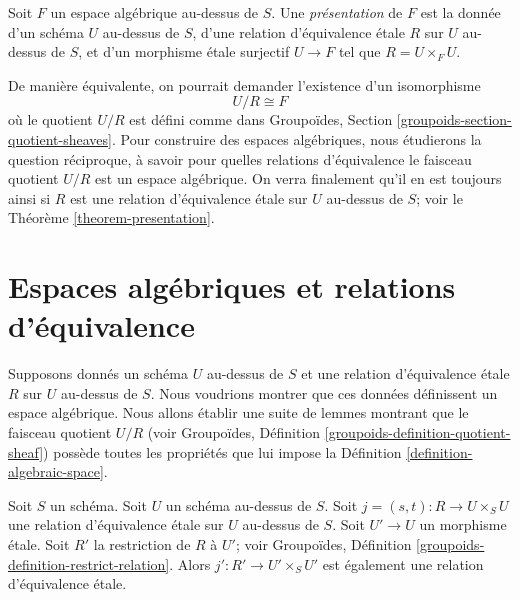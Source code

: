 \begin{definition}
\label{definition-presentation}
Soit $F$ un espace algébrique au-dessus de $S$.
Une {\it présentation} de $F$ est la donnée d'un schéma
$U$ au-dessus de $S$, d'une relation d'équivalence \'etale $R$ sur $U$ au-dessus de $S$, et
d'un morphisme \'etale surjectif $U \to F$ tel que $R = U \times_F U$.
\end{definition}

\noindent
De manière équivalente, on pourrait demander l'existence d'un isomorphisme
$$
U/R \cong F
$$
où le quotient $U/R$ est défini comme dans
Groupoïdes, Section \ref{groupoids-section-quotient-sheaves}.
Pour construire des espaces algébriques, nous étudierons la question réciproque, à savoir
pour quelles relations d'équivalence le faisceau quotient $U/R$ est un espace algébrique.
On verra finalement qu'il en est toujours ainsi si $R$ est une relation
d'équivalence \'etale sur $U$ au-dessus de $S$; voir le Théorème \ref{theorem-presentation}.





























\section{Espaces algébriques et relations d'équivalence}
\label{section-spaces-from-equivalence-relations}

\noindent
Supposons donnés un schéma $U$ au-dessus de $S$
et une relation d'équivalence \'etale $R$ sur $U$ au-dessus de $S$.
Nous voudrions montrer que ces données définissent un espace algébrique.
Nous allons établir une suite de lemmes montrant que le faisceau quotient $U/R$
(voir Groupoïdes, Définition \ref{groupoids-definition-quotient-sheaf})
possède toutes les propriétés que lui impose la
Définition \ref{definition-algebraic-space}.

\begin{lemma}
\label{lemma-pullback-etale-equivalence-relation}
Soit $S$ un schéma. Soit $U$ un schéma au-dessus de $S$.
Soit $j = (s, t) : R \to U \times_S U$
une relation d'équivalence \'etale sur $U$ au-dessus de $S$.
Soit $U' \to U$ un morphisme \'etale.
Soit $R'$ la restriction de $R$ à $U'$; voir
Groupoïdes, Définition \ref{groupoids-definition-restrict-relation}.
Alors $j' : R' \to U' \times_S U'$ est également une relation
d'équivalence \'etale.
\end{lemma}

